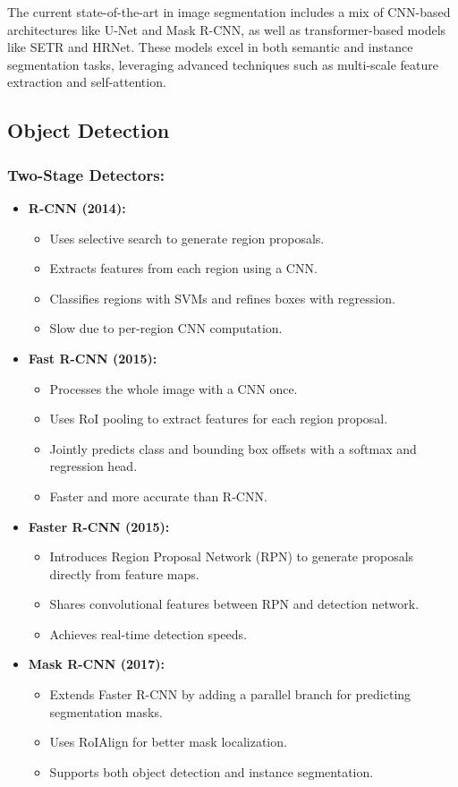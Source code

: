 \documentclass{article}
\begin{document}
The current state-of-the-art in image segmentation includes a mix of CNN-based architectures like U-Net and Mask R-CNN, as well as transformer-based models like SETR and HRNet. These models excel in both semantic and instance segmentation tasks, leveraging advanced techniques such as multi-scale feature extraction and self-attention.

\subsection{Object Detection}
\subsubsection{Two-Stage Detectors:}
\begin{itemize}[leftmargin=1.5em]
    \item \textbf{R-CNN (2014):} 
        \begin{itemize}
            \item Uses selective search to generate region proposals.
            \item Extracts features from each region using a CNN.
            \item Classifies regions with SVMs and refines boxes with regression.
            \item Slow due to per-region CNN computation.
        \end{itemize}
    \item \textbf{Fast R-CNN (2015):}
        \begin{itemize}
            \item Processes the whole image with a CNN once.
            \item Uses RoI pooling to extract features for each region proposal.
            \item Jointly predicts class and bounding box offsets with a softmax and regression head.
            \item Faster and more accurate than R-CNN.
        \end{itemize}
    \item \textbf{Faster R-CNN (2015):}
        \begin{itemize}
            \item Introduces Region Proposal Network (RPN) to generate proposals directly from feature maps.
            \item Shares convolutional features between RPN and detection network.
            \item Achieves real-time detection speeds.
        \end{itemize}
    \item \textbf{Mask R-CNN (2017):}
        \begin{itemize}
            \item Extends Faster R-CNN by adding a parallel branch for predicting segmentation masks.
            \item Uses RoIAlign for better mask localization.
            \item Supports both object detection and instance segmentation.
        \end{itemize}
\end{itemize}
\end{document}
